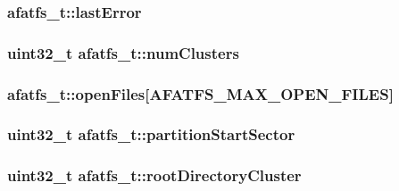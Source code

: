 \hypertarget{structafatfs__t_a29155f6a40ff7e59b17eaccd00d8ebd6}{
\subsubsection[{last\+Error}]{ afatfs\+\_\+t\+::last\+Error}}\label{structafatfs__t_a29155f6a40ff7e59b17eaccd00d8ebd6}
\hypertarget{structafatfs__t_a62834f2a8eac0fd41207edec5f010db1}{
\subsubsection[{num\+Clusters}]{\setlength{\rightskip}{0pt plus 5cm}uint32\+\_\+t afatfs\+\_\+t\+::num\+Clusters}}\label{structafatfs__t_a62834f2a8eac0fd41207edec5f010db1}
\hypertarget{structafatfs__t_a75322bb76641e102ee19d7e805742a57}{
\subsubsection[{open\+Files}]{ afatfs\+\_\+t\+::open\+Files\mbox{[}{\bf A\+F\+A\+T\+F\+S\+\_\+\+M\+A\+X\+\_\+\+O\+P\+E\+N\+\_\+\+F\+I\+L\+E\+S}\mbox{]}}}\label{structafatfs__t_a75322bb76641e102ee19d7e805742a57}
\hypertarget{structafatfs__t_ae4b82813964e5cbd736e920eecde4c7f}{
\subsubsection[{partition\+Start\+Sector}]{\setlength{\rightskip}{0pt plus 5cm}uint32\+\_\+t afatfs\+\_\+t\+::partition\+Start\+Sector}}\label{structafatfs__t_ae4b82813964e5cbd736e920eecde4c7f}
\hypertarget{structafatfs__t_af2fd51aa04bb8396d298dcbbd5db46cf}{
\subsubsection[{root\+Directory\+Cluster}]{\setlength{\rightskip}{0pt plus 5cm}uint32\+\_\+t afatfs\+\_\+t\+::root\+Directory\+Cluster}}\label{structafatfs__t_af2fd51aa04bb8396d298dcbbd5db46cf}
